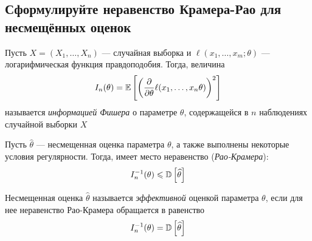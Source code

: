 \documentclass{article}
\begin{document}
\subsection{Сформулируйте неравенство Крамера-Рао для несмещённых оценок}
 Пусть $X=(X_1,\ldots,X_n)$ — случайная выборка и $\ell(x_1,\ldots,x_m;\theta)$ — логарифмическая функция правдоподобия. Тогда, величина 
\begin{equation*}
    I_n(\theta)=\mathbb{E}\left[\left(\frac{\partial}{\partial\theta}\ell(x_1,\ldots,x_n\theta)\right)^2\right]
\end{equation*}
называется \textit{информацией Фишера} о параметре $\theta$, содержащейся в $n$ наблюдениях случайной выборки $X$

\theorem Пусть $\widehat{\theta}$ — несмещенная оценка параметра $\theta$, а также выполнены некоторые условия регулярности. Тогда, имеет место неравенство (\textit{Рао-Крамера}):
\begin{equation*}
    I_n^{-1}(\theta)\leqslant \mathbb{D}\left[\widehat{\theta}\right]
\end{equation*}

 Несмещенная оценка $\widehat{\theta}$ называется \textit{эффективной} оценкой параметра $\theta$, если для нее неравенство Рао-Крамера обращается в равенство
\begin{equation*}
    I_n^{-1}(\theta)= \mathbb{D}\left[\widehat{\theta}\right]
\end{equation*} 
\end{document}
